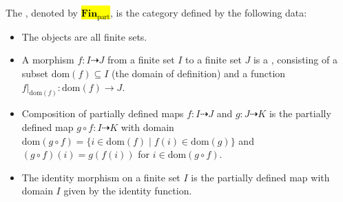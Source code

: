 \begin{definition} \label{definition:category_of_finite_sets_with_partially_defined_maps}
The , denoted by \hl{$\mathbf{Fin}_{\mathrm{part}}$}, is the category defined by the following data:
\begin{itemize}
    \item The objects are all finite sets.
    \item A morphism $f : I \dashrightarrow J$ from a finite set $I$ to a finite set $J$ is a , consisting of a subset $\mathrm{dom}(f) \subseteq I$ (the domain of definition) and a function $f|_{\mathrm{dom}(f)} : \mathrm{dom}(f) \to J$.
    \item Composition of partially defined maps $f : I \dashrightarrow J$ and $g : J \dashrightarrow K$ is the partially defined map $g \circ f : I \dashrightarrow K$ with domain $\mathrm{dom}(g \circ f) = \{i \in \mathrm{dom}(f) \mid f(i) \in \mathrm{dom}(g)\}$ and $(g \circ f)(i) = g(f(i))$ for $i \in \mathrm{dom}(g \circ f)$.
    \item The identity morphism on a finite set $I$ is the partially defined map with domain $I$ given by the identity function.
\end{itemize}
\end{definition}
